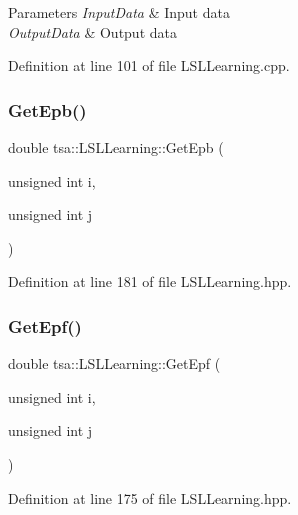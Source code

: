 \begin{DoxyParams}{Parameters}
{\em Input\+Data} & Input data \\
\hline
{\em Output\+Data} & Output data \\
\hline
\end{DoxyParams}


Definition at line 101 of file L\+S\+L\+Learning.\+cpp.

\mbox{\label{classtsa_1_1_l_s_l_learning_ad05ee328f1a40de4fc73bd9770ae08c2}} 
\subsubsection{\texorpdfstring{Get\+Epb()}{GetEpb()}}
{\footnotesize\ttfamily double tsa\+::\+L\+S\+L\+Learning\+::\+Get\+Epb (\begin{DoxyParamCaption}\item[{unsigned int}]{i,  }\item[{unsigned int}]{j }\end{DoxyParamCaption})\hspace{0.3cm}{\ttfamily [inline]}}



Definition at line 181 of file L\+S\+L\+Learning.\+hpp.

\mbox{\label{classtsa_1_1_l_s_l_learning_adaca2870907d65690fcaec01f4d96c95}} 
\subsubsection{\texorpdfstring{Get\+Epf()}{GetEpf()}}
{\footnotesize\ttfamily double tsa\+::\+L\+S\+L\+Learning\+::\+Get\+Epf (\begin{DoxyParamCaption}\item[{unsigned int}]{i,  }\item[{unsigned int}]{j }\end{DoxyParamCaption})\hspace{0.3cm}{\ttfamily [inline]}}



Definition at line 175 of file L\+S\+L\+Learning.\+hpp.

